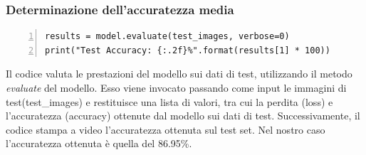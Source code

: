 \documentclass[a4paper,final,12pt]{report}
\begin{document}
\subsubsection{Determinazione dell'accuratezza media}
\begin{lstlisting}[caption={Determinazione dell'accuratezza.}, label={lst:accuratezza_media}, breaklines, escapechar=`\%, frame=lines, basicstyle=\small\ttfamily, keepspaces=true, numbers=left]
results = model.evaluate(test_images, verbose=0)
print("Test Accuracy: {:.2f}%".format(results[1] * 100))
\end{lstlisting}
Il codice valuta le prestazioni del modello sui dati di test, utilizzando il metodo \textit{evaluate} del modello. Esso viene invocato passando come input le immagini di test(test\_images) e restituisce una lista di valori, tra cui la perdita (loss) e l'accuratezza (accuracy) ottenute dal modello sui dati di test.
Successivamente, il codice stampa a video l'accuratezza ottenuta sul test set.
Nel nostro caso l'accuratezza ottenuta è quella del 86.95\%.
\end{document}

